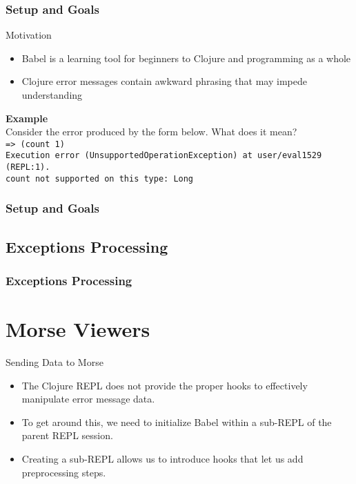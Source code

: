 \documentclass{beamer}
\begin{document}
\begin{frame}
    \frametitle{Setup and Goals}
    Motivation
    \begin{itemize}
        \item Babel is a learning tool for beginners to Clojure and programming as a whole
        \item Clojure error messages contain awkward phrasing that may impede understanding
    \end{itemize}
    \textbf{Example} \\
    Consider the error produced by the form below. What does it mean? \\
    \texttt{=> (count 1)} \\
    \texttt{Execution error (UnsupportedOperationException) at user/eval1529 (REPL:1).} \\
    \texttt{count not supported on this type: Long} \\
\end{frame}
    
\begin{frame}
\frametitle{Setup and Goals}

\end{frame}

\subsection{Exceptions Processing}

\begin{frame}
\frametitle{Exceptions Processing}

\end{frame}

\section{Morse Viewers}

\begin{frame}{Sending Data to Morse}
  \begin{itemize}
    \item<1-> The Clojure REPL does not provide the proper hooks to effectively manipulate error message data.
    \item<2-> To get around this, we need to initialize Babel within a sub-REPL of the parent REPL session.
    \item<3-> Creating a sub-REPL allows us to introduce hooks that let us add preprocessing steps.
  \end{itemize}
\end{frame}
\end{document}
